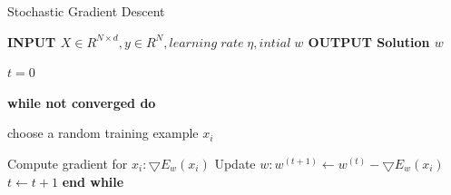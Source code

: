 \documentclass{sigplanconf}
\newlength\myindent
\newcommand\bindent{%
  \begingroup
  \setlength{\itemindent}{\myindent}
  \addtolength{\algorithmicindent}{\myindent}
}
\newcommand\eindent{\endgroup}
\begin{document}
\begin{algorithm}
\caption{Stochastic Gradient Descent}
\begin{algorithmic} 

\STATE \bf{INPUT} \begin{math} X \in {R}^{N \times  d}, y \in R^N, learning\;  rate\;  \eta, intial\; w \end{math} 
\STATE \bf{OUTPUT} \textnormal{Solution} \begin{math}  w \end{math} 

	\STATE \textnormal{\begin{math} t = 0\end{math} }

	\STATE \bf{while} \textnormal{not converged} \bf{do}
    	\bindent
	 \STATE \textnormal{\indent choose a random training example \begin{math}x_i\end{math}}

	 \STATE \textnormal{\indent Compute gradient for \begin{math}x_i: \bigtriangledown{E_w(x_i)}\end{math}}
	 \STATE \textnormal{\indent Update \begin{math}w: w^{(t+1)} \gets w^{(t)} - \bigtriangledown{E_w(x_i)}\end{math}}
	 \STATE \textnormal{\indent \begin{math}t \gets t + 1\end{math}}
	    \eindent
	\STATE \bf{end while}

\end{algorithmic}
\end{algorithm}
\end{document}
